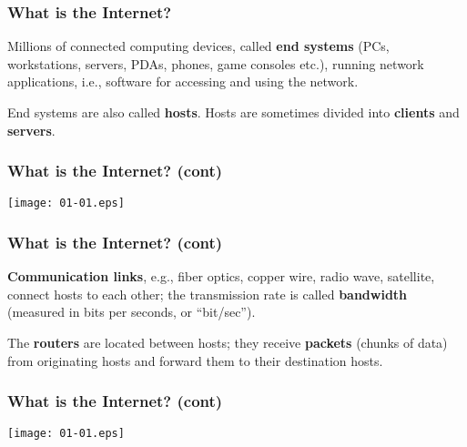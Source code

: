 
%
\begin{frame}
\frametitle{What is the Internet?}

Millions of connected computing devices, called \textbf{end systems}
(PCs, workstations, servers, PDAs, phones, game consoles etc.),
running network applications, i.e., software for accessing and using
the network.

\bigskip

End systems are also called \textbf{hosts}. Hosts are sometimes
divided into \textbf{clients} and \textbf{servers}.

\end{frame}

%
\begin{frame}
\frametitle{What is the Internet? (cont)}

\begin{center}
  \texttt{[image: 01-01.eps]}
\end{center}

\end{frame}

%
\begin{frame}
\frametitle{What is the Internet? (cont)}

\textbf{Communication links}, e.g., fiber optics, copper wire, radio
wave, satellite, connect hosts to each other; the transmission rate is
called \textbf{bandwidth} (measured in bits per seconds, or
``bit/sec'').

\bigskip
   
The \textbf{routers} are located between hosts; they receive
\textbf{packets} (chunks of data) from originating hosts and forward
them to their destination hosts.

\end{frame}

%
\begin{frame}
\frametitle{What is the Internet? (cont)}

\begin{center}
  \texttt{[image: 01-01.eps]}
\end{center}

\end{frame}

